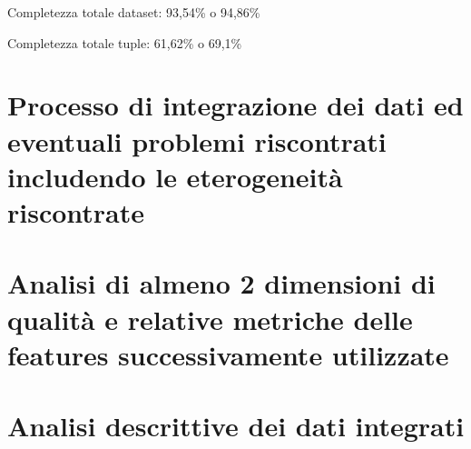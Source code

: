 Completezza totale dataset: 93,54\% o 94,86\%

Completezza totale tuple: 61,62\% o 69,1\%





\section{Processo di integrazione dei dati ed eventuali problemi riscontrati includendo le eterogeneità riscontrate}
\section{Analisi di almeno 2 dimensioni di qualità e relative metriche delle features successivamente utilizzate}
\section{Analisi descrittive dei dati integrati}
